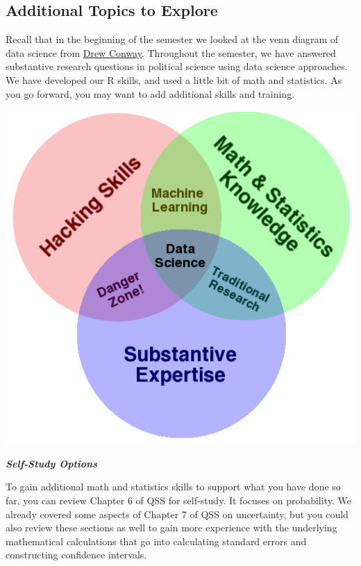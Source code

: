 \documentclass[
  letterpaper,
  DIV=11,
  numbers=noendperiod]{scrreprt}
\begin{document}
\hypertarget{additional-topics-to-explore}{%
\subsection{Additional Topics to
Explore}\label{additional-topics-to-explore}}

Recall that in the beginning of the semester we looked at the venn
diagram of data science from
\href{http://drewconway.com/zia/2013/3/26/the-data-science-venn-diagram}{Drew
Conway}. Throughout the semester, we have answered substantive research
questions in political science using data science approaches. We have
developed our R skills, and used a little bit of math and statistics. As
you go forward, you may want to add additional skills and training.

\includegraphics{images/venn.png}

\textbf{\emph{Self-Study Options}}

To gain additional math and statistics skills to support what you have
done so far, you can review Chapter 6 of QSS for self-study. It focuses
on probability. We already covered some aspects of Chapter 7 of QSS on
uncertainty, but you could also review these sections as well to gain
more experience with the underlying mathematical calculations that go
into calculating standard errors and constructing confidence intervals.
\end{document}

